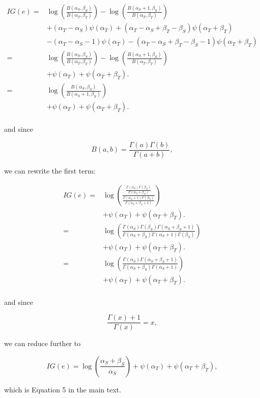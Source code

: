\documentclass[12pt]{article}
\begin{document}
\begin{equation}
\begin{split}
IG(e)  = & \log( \frac{B(\alpha_{S},\beta_{S})}{B(\alpha_{T},\beta_{T})}) - \log( \frac{B(\alpha_{S}+1,\beta_{S})}{B(\alpha_{T},\beta_{T})}) \\ 
& + (\alpha_T - \alpha_S) \psi (\alpha_T) +  (\alpha_T - \alpha_S + \beta_T - \beta_S) \psi (\alpha_T + \beta_T)  \\
& - (\alpha_T - \alpha_{S} - 1) \psi (\alpha_T) - (\alpha_T - \alpha_{S} + \beta_T - \beta_{S} - 1) \psi (\alpha_T + \beta_T) \\
= & \log( \frac{B(\alpha_{S},\beta_{S})}{B(\alpha_{T},\beta_{T})})   - \log( \frac{B(\alpha_{S}+1,\beta_{S})}{B(\alpha_{T},\beta_{T})}) \\ 
& + \psi (\alpha_T) + \psi (\alpha_T + \beta_T). \\
= & \log( \frac{B(\alpha_{S},\beta_{S})}{B(\alpha_{S}+1,\beta_{S})})   \\
& + \psi (\alpha_T) + \psi (\alpha_T + \beta_T). \\
\end{split}
\end{equation}

and since 

\begin{equation}
B(a,b) = \frac{\Gamma(a)\Gamma(b)}{\Gamma(a+b)},
\end{equation}

we can rewrite the first term:

\begin{equation}
\begin{split}
IG(e) = & \log( \frac{\frac{\Gamma(\alpha_S)\Gamma(\beta_S)}{\Gamma(\alpha_S+\beta_S)}}{\frac{\Gamma(\alpha_S + 1)\Gamma(\beta_S)}{\Gamma(\alpha_S+\beta_S + 1)}})   \\
& + \psi (\alpha_T) + \psi (\alpha_T + \beta_T). \\
=& \log( \frac{\Gamma(\alpha_S)\Gamma(\beta_S) \Gamma(\alpha_S+\beta_S + 1)}{\Gamma(\alpha_S+\beta_S) \Gamma(\alpha_S + 1)\Gamma(\beta_S)})   \\
& + \psi (\alpha_T) + \psi (\alpha_T + \beta_T). \\
=& \log( \frac{\Gamma(\alpha_S) \Gamma(\alpha_S+\beta_S + 1)}{\Gamma(\alpha_S+\beta_S) \Gamma(\alpha_S + 1)})   \\
& + \psi (\alpha_T) + \psi (\alpha_T + \beta_T). \\
\end{split}
\end{equation}

and since 

\begin{equation}
\frac{\Gamma(x) + 1}{\Gamma(x)} = x,
\end{equation}

we can reduce further to

\begin{equation}
IG(e) = \log(\frac{\alpha_S + \beta_S}{\alpha_S}) + \psi (\alpha_T) + \psi (\alpha_T + \beta_T), 
\end{equation}

which is Equation 5 in the main text. 
\end{document}
